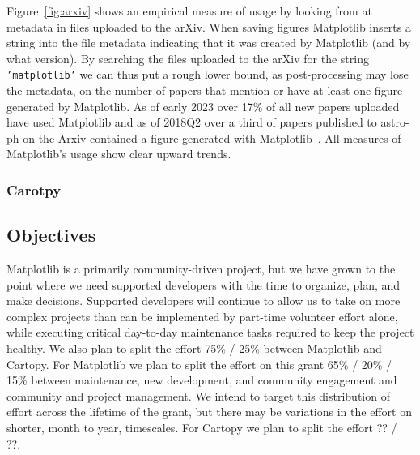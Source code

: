 \documentclass[12pt]{article}
\numberwithin{page}{section}
\begin{document}
Figure~\ref{fig:arxiv} shows an empirical measure of usage by looking from at
metadata in files uploaded to the arXiv.  When saving figures Matplotlib
inserts a string into the file metadata indicating that it was created by
Matplotlib (and by what version).  By searching the files uploaded to the arXiv
for the string \texttt{'matplotlib'} we can thus put a rough lower bound, as
post-processing may lose the metadata, on the number of papers that mention or
have at least one figure generated by Matplotlib.  As of early 2023 over 17\%
of all new papers uploaded have used Matplotlib and as of 2018Q2 over a third
of papers published to astro-ph on the Arxiv contained a figure generated with
Matplotlib~\cite{arxvi_stats}.  All measures of Matplotlib's usage show clear upward
trends.

\subsubsection{Carotpy}


\subsection{Objectives}


Matplotlib is a primarily community-driven project, but we have grown to the
point where we need supported developers with the time to organize, plan, and
make decisions.  Supported developers will continue to allow us to take on more
complex projects than can be implemented by part-time volunteer effort alone,
while executing critical day-to-day maintenance tasks required to keep the
project healthy.  We also plan to split the effort 75\% / 25\% between
Matplotlib and Cartopy.  For Matplotlib we plan to split the effort on this
grant 65\% / 20\% / 15\% between maintenance, new development, and community
engagement and community and project management.  We intend to target this distribution
of effort across the lifetime of the grant, but there may be variations in the effort
on shorter, month to year, timescales.
For Cartopy we plan to split the effort ?? / ??.  %
\end{document}
